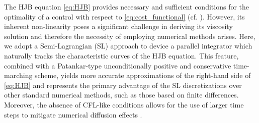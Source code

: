 \documentclass[10pt]{article}
\theoremstyle{remark}
\theoremstyle{definition}
\theoremstyle{remark}
\begin{document}
The HJB equation \eqref{eq:HJB} provides necessary and sufficient conditions for the optimality of a control with respect to \eqref{eq:cost_functional} (cf. \cite[Section 3.4]{BardiCapuzzoDocetta2008}). However, its inherent non-linearity poses a significant challenge in deriving its viscosity solution and therefore the necessity of employing numerical methods arises. Here, we adopt a  Semi-Lagrangian (SL) approach to device a parallel integrator which naturally tracks the characteristic curves of the HJB equation. This feature, combined with a Patankar-type unconditionally positive and conservative time-marching scheme, yields more accurate approximations of the right-hand side of \eqref{eq:HJB} and represents the primary advantage of the SL discretizations over other standard numerical methods, such as those based on finite differences. Moreover, the absence of CFL-like conditions allows for the use of larger time steps to mitigate numerical diffusion effects \cite{FalconeFerretti2016}. 
\end{document}
